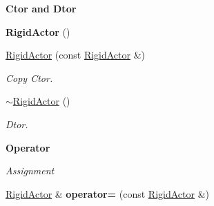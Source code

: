 \begin{Indent}{\bf Ctor and Dtor}\par
{\em \label{_amgrpad04e46909a047f9938f8e1fa1abe24a}
 }\begin{DoxyCompactItemize}
\item 
\hypertarget{classContent_1_1Actor_1_1Admin_1_1RigidActor_aaecaa2746cec95d691f68632edc9c2bc}{
{\bfseries RigidActor} ()}
\label{classContent_1_1Actor_1_1Admin_1_1RigidActor_aaecaa2746cec95d691f68632edc9c2bc}

\item 
\hypertarget{classContent_1_1Actor_1_1Admin_1_1RigidActor_a201fba823a698aa0faeac6dd2e2f395c}{
\hyperlink{classContent_1_1Actor_1_1Admin_1_1RigidActor_a201fba823a698aa0faeac6dd2e2f395c}{RigidActor} (const \hyperlink{classContent_1_1Actor_1_1Admin_1_1RigidActor}{RigidActor} \&)}
\label{classContent_1_1Actor_1_1Admin_1_1RigidActor_a201fba823a698aa0faeac6dd2e2f395c}

\begin{DoxyCompactList}\small\item\em Copy Ctor. \item\end{DoxyCompactList}\item 
\hypertarget{classContent_1_1Actor_1_1Admin_1_1RigidActor_a14cea7f4ed85f7214bba8bfb54fe81f6}{
\hyperlink{classContent_1_1Actor_1_1Admin_1_1RigidActor_a14cea7f4ed85f7214bba8bfb54fe81f6}{$\sim$RigidActor} ()}
\label{classContent_1_1Actor_1_1Admin_1_1RigidActor_a14cea7f4ed85f7214bba8bfb54fe81f6}

\begin{DoxyCompactList}\small\item\em Dtor. \item\end{DoxyCompactList}\end{DoxyCompactItemize}
\end{Indent}
\begin{Indent}{\bf Operator}\par
{\em \label{_amgrpe1b3ec89ead7f83a9245ed5c9cacfdbf}
 Assignment }\begin{DoxyCompactItemize}
\item 
\hypertarget{classContent_1_1Actor_1_1Admin_1_1RigidActor_a86c486a6b4e527bc6fb7a2c69b81f55e}{
\hyperlink{classContent_1_1Actor_1_1Admin_1_1RigidActor}{RigidActor} \& {\bfseries operator=} (const \hyperlink{classContent_1_1Actor_1_1Admin_1_1RigidActor}{RigidActor} \&)}
\label{classContent_1_1Actor_1_1Admin_1_1RigidActor_a86c486a6b4e527bc6fb7a2c69b81f55e}

\end{DoxyCompactItemize}
\end{Indent}
